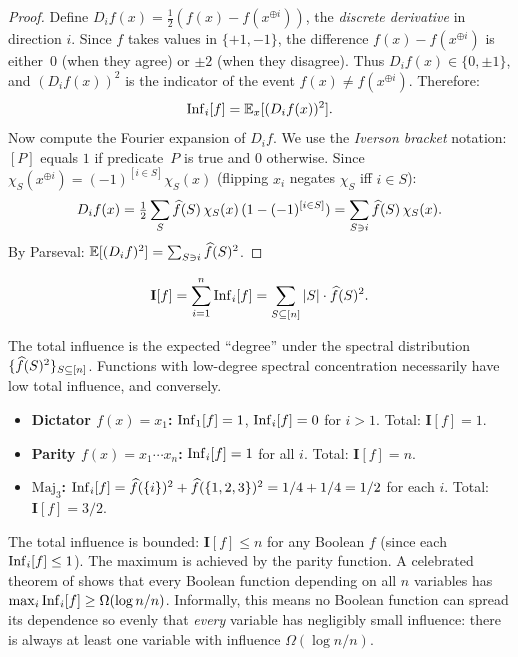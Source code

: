 \begin{proof}
Define $D_i f(x) = \frac{1}{2}(f(x) - f(x^{\oplus i}))$, the
\emph{discrete derivative} in direction $i$. Since $f$ takes values in
$\{+1,-1\}$, the difference $f(x) - f(x^{\oplus i})$ is either~$0$
(when they agree) or $\pm 2$ (when they disagree). Thus $D_i f(x) \in
\{0, \pm 1\}$, and $(D_i f(x))^2$ is the indicator of the event
$f(x) \neq f(x^{\oplus i})$. Therefore:
\[
  \operatorname{Inf}_i[f] = \mathbb{E}_x[(D_i f(x))^2].
\]
Now compute the Fourier expansion of $D_i f$. We use the
\emph{Iverson bracket} notation: $[P]$ equals $1$ if predicate~$P$ is
true and $0$ otherwise. Since
$\chi_S(x^{\oplus i}) = (-1)^{[i \in S]} \chi_S(x)$ (flipping $x_i$
negates $\chi_S$ iff $i \in S$):
\[
  D_i f(x) = \tfrac{1}{2}\sum_S \widehat{f}(S)\,\chi_S(x)\,(1 - (-1)^{[i \in S]})
  = \sum_{S \ni i} \widehat{f}(S)\,\chi_S(x).
\]
By Parseval: $\mathbb{E}[(D_i f)^2] = \sum_{S \ni i} \widehat{f}(S)^2$.
\end{proof}

\begin{definition}\label{def:total-influence}
\begin{equation}\label{eq:total-influence}
  \mathbf{I}[f] = \sum_{i=1}^n \operatorname{Inf}_i[f]
  = \sum_{S \subseteq [n]} |S| \cdot \widehat{f}(S)^2.
\end{equation}
\end{definition}

The total influence is the expected ``degree'' under the spectral
distribution $\{\widehat{f}(S)^2\}_{S \subseteq [n]}$. Functions with
low-degree spectral concentration necessarily have low total influence,
and conversely.

\begin{example}\label{ex:influences}
\begin{itemize}
  \item \textbf{Dictator $f(x) = x_1$:}
    $\operatorname{Inf}_1[f] = 1$, $\operatorname{Inf}_i[f] = 0$ for $i > 1$. Total: $\mathbf{I}[f] = 1$.
  \item \textbf{Parity $f(x) = x_1 \cdots x_n$:}
    $\operatorname{Inf}_i[f] = 1$ for all $i$. Total: $\mathbf{I}[f] = n$.
  \item \textbf{$\text{Maj}_3$:}
    $\operatorname{Inf}_i[f] = \widehat{f}(\{i\})^2 + \widehat{f}(\{1,2,3\})^2 = 1/4 + 1/4 = 1/2$
    for each $i$. Total: $\mathbf{I}[f] = 3/2$.
\end{itemize}
\end{example}

The total influence is bounded: $\mathbf{I}[f] \leq n$ for any Boolean
$f$ (since each $\operatorname{Inf}_i[f] \leq 1$). The maximum is achieved by the
parity function. A celebrated theorem of
\citet{kahn1988influence} shows that every Boolean function depending on
all $n$ variables has $\max_i \operatorname{Inf}_i[f] \geq \Omega(\log n / n)$.
Informally, this means no Boolean function can spread its dependence so
evenly that \emph{every} variable has negligibly small influence: there
is always at least one variable with influence $\Omega(\log n / n)$.


